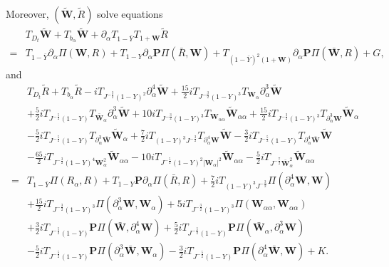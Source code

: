 \documentclass[10pt]{amsart}
\theoremstyle{remark}
\theoremstyle{definition}
\numberwithin{equation}{section}
\newcommand{\p}{\partial}
\newcommand{\al}{\alpha}
\newcommand{\f}{\frac}
\newcommand{\bw}{\mathbf{W}}
\newcommand{\nP}{{\mathbf P}}
\begin{document}
Moreover, $(\tilde{\bw}, \tilde{R})$ solve equations 
\begin{align*}
&T_{D_t}\tilde{\bw} + T_{b_\alpha}\tilde{\bw} + \partial_\alpha T_{1-\bar{Y}}T_{1+\bw} \tilde{R} \\
=&  T_{1- \bar{Y}}\p_\al \Pi(\bw, R)+ T_{1-Y}\partial_\alpha \nP \Pi( \bar{R}, \bw) +T_{(1-\bar{Y})^2(1+\bw)}\partial_\alpha \nP\Pi(\bar{\bw}, R) + G,
\end{align*}    
and 
\begin{align*}
&T_{D_t}\tilde{R}+ T_{b_\alpha}\tilde{R} -iT_{J^{-\f32}(1-Y)^2}\p^4_{\al}\tilde{\bw}+\f{15}{2}iT_{J^{-\f32}(1-Y)^3}T_{\bw_{\al}}\p^{3}_{\al}\tilde{\bw}\\
&+\f52iT_{J^{-\f52}(1-Y)}T_{\bar{\bw}_{\al}}\p^3_{\al}\tilde{\bw}+10iT_{J^{-\f32}(1-Y)^3}T_{\bw_{\al\al}}\tilde{\bw}_{\al\al}+\f{15}{2}iT_{J^{-\f32}(1-Y)^3}T_{\p^3_{\al}\bw}\tilde{\bw}_{\al}\\
&-\f52 iT_{J^{-\f52}(1-Y)}T_{\p^3_{\al}\bar{\bw}}
\tilde{\bw}_{\al} +\f72iT_{(1-Y)^3J^{-\f32}}T_{\p^4_{\al}\bw}\tilde{\bw}- \f32i T_{J^{-\f52}(1-Y)}T_{\p^4_{\al}\bar{\bw}} \tilde{\bw} \\
&-\f{65}{2}iT_{J^{-\f32}(1-Y)^4\bw_{\al}^2}\tilde{\bw}_{\al\al}-10iT_{J^{-\f52}(1-Y)^2|\bw_{\al}|^2}\tilde{\bw}_{\al\al}-\f{5}{2}iT_{J^{-\f72}\bar{\bw}_{\al}^2}\tilde{\bw}_{\al\al} \\
=&T_{1-\bar{Y}}\Pi(R_\alpha, R) + T_{1-Y}\nP \p_\al\Pi(\bar{R}, R) +\f72i T_{(1-Y)^3J^{-\f32}}\Pi(\p^4_{\al}\bw,\bw) \\
&+\f{15}{2}iT_{J^{-\f32}(1-Y)^3}\Pi(\p^3_{\al}\bw,\bw_{\al}) +5iT_{J^{-\f32}(1-Y)^3}\Pi(\bw_{\al\al},\bw_{\al\al})\\
&+\f32i T_{J^{-\f52}(1-Y)}\nP\Pi(\bar{\bw}, \p^4_{\al}\bw)+\f52i T_{J^{-\f52}(1-Y)}\nP\Pi(\bar{\bw}_{\al}, \p^3_{\al}\bw)\\
&-\f52i T_{J^{-\f52}(1-Y)}\nP\Pi(\p^3_{\al}\bar{\bw}, \bw_{\al}) -\f32i T_{J^{-\f52}(1-Y)}\nP\Pi(\p^4_{\al}\bar{\bw}, \bw)   + K.
\end{align*}    
\end{document}
